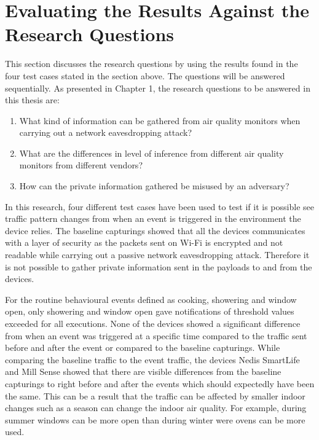\section{Evaluating the Results Against the Research Questions}
This section discusses the research questions by using the results found in the four test cases stated in the section above. The questions will be answered sequentially. As presented in Chapter 1, the research questions to be answered in this thesis are:

\begin{enumerate}
    \item What kind of information can be gathered from air quality monitors when carrying out a network eavesdropping attack?
    \item What are the differences in level of inference from different air quality monitors from different vendors?
    \item How can the private information gathered be misused by an adversary?
\end{enumerate}

In this research, four different test cases have been used to test if it is possible see traffic pattern changes from when an event is triggered in the environment the device relies. The baseline capturings showed that all the devices communicates with a layer of security as the packets sent on \gls{Wi-Fi} is encrypted and not readable while carrying out a passive network eavesdropping attack. Therefore it is not possible to gather private information sent in the payloads to and from the devices. 

For the routine behavioural events defined as cooking, showering and window open, only showering and window open gave notifications of threshold values exceeded for all executions. None of the devices showed a significant difference from when an event was triggered at a specific time compared to the traffic sent before and after the event or compared to the baseline capturings. While comparing the baseline traffic to the event traffic, the devices Nedis SmartLife and Mill Sense showed that there are visible differences from the baseline capturings to right before and after the events which should expectedly have been the same. This can be a result that the traffic can be affected by smaller indoor changes such as a season can change the indoor air quality. For example, during summer windows can be more open than during winter were ovens can be more used. 

